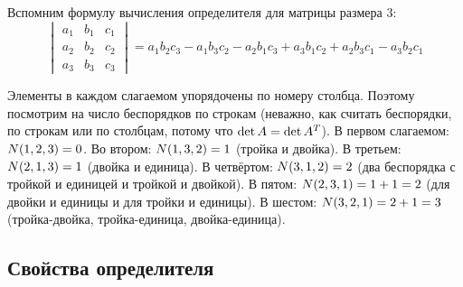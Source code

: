\documentclass[a4paper,12pt]{article}
\begin{document}
  \begin{example}
    Вспомним формулу вычисления определителя для матрицы размера $3$:
    \begin{equation*}
      \begin{vmatrix}
        a_1 & b_1 & c_1\\
        a_2 & b_2 & c_2\\
        a_3 & b_3 & c_3
      \end{vmatrix}
        = a_1 b_2 c_3 - a_1 b_3 c_2 - a_2 b_1 c_3 + a_3 b_1 c_2 + a_2 b_3 c_1 - a_3 b_2 c_1
    \end{equation*}
    
    Элементы в каждом слагаемом упорядочены по номеру столбца.
    Поэтому посмотрим на число беспорядков по строкам (неважно, как считать беспорядки, по строкам или по столбцам, потому что $\det A \hm= \det A^T$).
    В первом слагаемом: $N(1, 2, 3) \hm= 0$.
    Во втором: $N(1, 3, 2) \hm= 1$ (тройка и двойка).
    В третьем: $N(2, 1, 3) \hm= 1$ (двойка и единица).
    В четвёртом: $N(3, 1, 2) \hm= 2$ (два беспорядка с тройкой и единицей и тройкой и двойкой).
    В пятом: $N(2, 3, 1) \hm= 1 \hm+ 1 \hm= 2$ (для двойки и единицы и для тройки и единицы).
    В шестом: $N(3, 2, 1) \hm= 2 \hm+ 1 \hm= 3$ (тройка-двойка, тройка-единица, двойка-единица).
  \end{example}
  
  
  \subsection{Свойства определителя}
  
\end{document}
